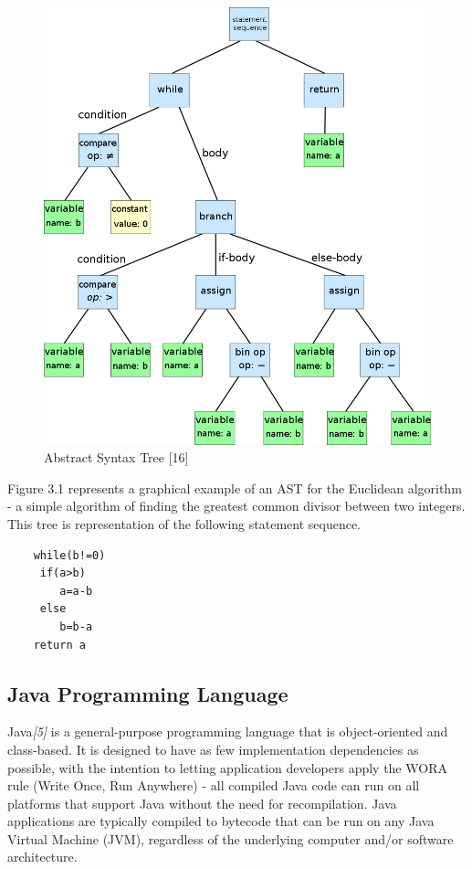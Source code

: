 \documentclass[12pt,a4paper,twoside]{report}
\begin{document}
\begin{figure}[H]
	\centering
	\includegraphics[scale=0.45]{img/diags/AST.png}
	\caption{Abstract Syntax Tree [16]}
\end{figure}

Figure 3.1 represents a graphical example of an AST for the Euclidean algorithm - a simple algorithm of finding the greatest common divisor between two integers. This tree is representation of the following statement sequence.

\begin{lstlisting}
	while(b!=0) 
	 if(a>b)
	 	a=a-b
	 else
	 	b=b-a
	return a
\end{lstlisting}

\subsection{Java Programming Language}
Java{\it[5]}  is a general-purpose programming language that is object-oriented and class-based. It is designed to have as few implementation dependencies as possible, with the intention to letting application developers apply the WORA rule (Write Once, Run Anywhere) - all compiled Java code can run on all platforms that support Java without the need for recompilation. 
Java applications are typically compiled to bytecode that can be run on any Java Virtual Machine (JVM), regardless of the underlying computer and/or software architecture. 
\end{document}
